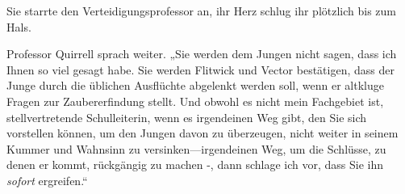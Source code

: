 Sie starrte den Verteidigungsprofessor an, ihr Herz schlug ihr plötzlich bis zum Hals.

Professor Quirrell sprach weiter.
„Sie werden dem Jungen nicht sagen, dass ich Ihnen so viel gesagt habe. Sie werden Flitwick und Vector bestätigen, dass der Junge durch die üblichen Ausflüchte abgelenkt werden soll, wenn er altkluge Fragen zur Zaubererfindung stellt. Und obwohl es nicht mein Fachgebiet ist, stellvertretende Schulleiterin, wenn es irgendeinen Weg gibt, den Sie sich vorstellen können, um den Jungen davon zu überzeugen, nicht weiter in seinem Kummer und Wahnsinn zu versinken—irgendeinen Weg, um die Schlüsse, zu denen er kommt, rückgängig zu machen -, dann schlage ich vor, dass Sie ihn \emph{sofort} ergreifen.“
